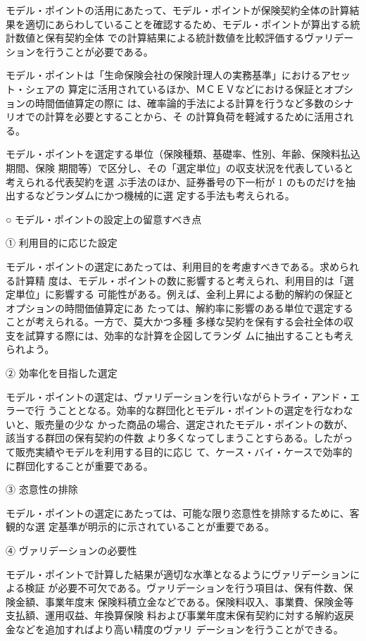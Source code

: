 \documentclass[report,gutter=10mm,fore-edge=10mm,uplatex,dvipdfmx]{jlreq}
\begin{document}
モデル・ポイントの活用にあたって、モデル・ポイントが保険契約全体の計算結果を適切にあらわしていることを確認するため、モデル・ポイントが算出する統計数値と保有契約全体
での計算結果による統計数値を比較評価するヴァリデーションを行うことが必要である。

モデル・ポイントは「生命保険会社の保険計理人の実務基準」におけるアセット・シェアの
算定に活用されているほか、ＭＣＥＶなどにおける保証とオプションの時間価値算定の際に
は、確率論的手法による計算を行うなど多数のシナリオでの計算を必要とすることから、そ
の計算負荷を軽減するために活用される。

モデル・ポイントを選定する単位（保険種類、基礎率、性別、年齢、保険料払込期間、保険
期間等）で区分し、その「選定単位」の収支状況を代表していると考えられる代表契約を選
ぶ手法のほか、証券番号の下一桁が 1 のものだけを抽出するなどランダムにかつ機械的に選
定する手法も考えられる。


○ モデル・ポイントの設定上の留意すべき点

① 利用目的に応じた設定

モデル・ポイントの選定にあたっては、利用目的を考慮すべきである。求められる計算精
度は、モデル・ポイントの数に影響すると考えられ、利用目的は「選定単位」に影響する
可能性がある。例えば、金利上昇による動的解約の保証とオプションの時間価値算定にあ
たっては、解約率に影響のある単位で選定することが考えられる。一方で、莫大かつ多種
多様な契約を保有する会社全体の収支を試算する際には、効率的な計算を企図してランダ
ムに抽出することも考えられよう。

② 効率化を目指した選定

モデル・ポイントの選定は、ヴァリデーションを行いながらトライ・アンド・エラーで行
うこととなる。効率的な群団化とモデル・ポイントの選定を行なわないと、販売量の少な
かった商品の場合、選定されたモデル・ポイントの数が、該当する群団の保有契約の件数
より多くなってしまうことすらある。したがって販売実績やモデルを利用する目的に応じ
て、ケース・バイ・ケースで効率的に群団化することが重要である。

③ 恣意性の排除

モデル・ポイントの選定にあたっては、可能な限り恣意性を排除するために、客観的な選
定基準が明示的に示されていることが重要である。

④ ヴァリデーションの必要性

モデル・ポイントで計算した結果が適切な水準となるようにヴァリデーションによる検証
が必要不可欠である。ヴァリデーションを行う項目は、保有件数、保険金額、事業年度末
保険料積立金などである。保険料収入、事業費、保険金等支払額、運用収益、年換算保険
料および事業年度末保有契約に対する解約返戻金などを追加すればより高い精度のヴァリ
デーションを行うことができる。
\end{document}
